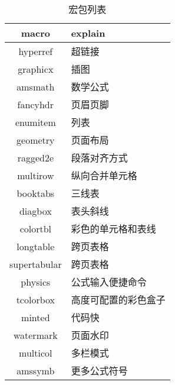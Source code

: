 \documentclass[a4paper]{ctexart}    %
\begin{document}
\begin{table}[htpb]
    \centering
    \caption{宏包列表}
    \begin{tabular}{c|l}
    \hline
    macro & explain \\\hline
    hyperref & 超链接 \\\hline
    graphicx & 插图 \\\hline
    amsmath & 数学公式 \\\hline
    fancyhdr & 页眉页脚 \\\hline
    enumitem & 列表 \\\hline
    geometry & 页面布局 \\\hline
    ragged2e & 段落对齐方式 \\\hline
    multirow & 纵向合并单元格 \\\hline
    booktabs & 三线表 \\\hline
    diagbox & 表头斜线 \\\hline
    colortbl & 彩色的单元格和表线 \\\hline
    longtable & 跨页表格 \\\hline
    supertabular & 跨页表格 \\\hline
    physics & 公式输入便捷命令 \\\hline
    tcolorbox & 高度可配置的彩色盒子 \\\hline
    minted & 代码快 \\\hline
    watermark & 页面水印 \\\hline
    multicol & 多栏模式 \\\hline
    amssymb & 更多公式符号 \\\hline
    \hline
    \end{tabular}
\end{table}
\end{document}
